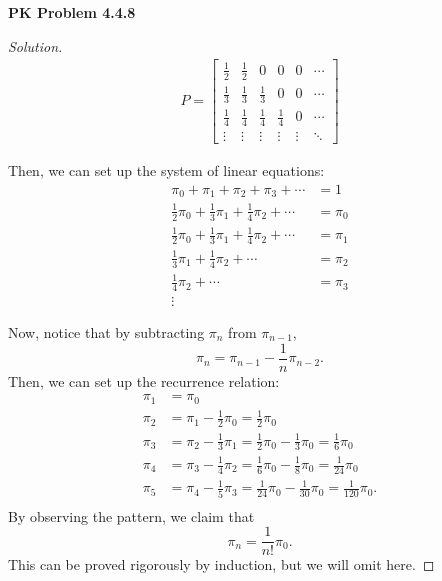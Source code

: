 \documentclass{article}
\begin{document}
\textbf{PK Problem 4.4.8}
\begin{proof}[Solution]
    \begin{align*}
        P = \begin{bmatrix}
            \frac{1}{2} & \frac{1}{2} & 0 & 0 & 0 & \cdots \\
            \frac{1}{3} & \frac{1}{3} & \frac{1}{3} & 0 & 0 & \cdots \\
            \frac{1}{4} & \frac{1}{4} & \frac{1}{4} & \frac{1}{4} & 0 & \cdots \\
            \vdots & \vdots & \vdots & \vdots & \vdots & \ddots
        \end{bmatrix}
    \end{align*}

    Then, we can set up the system of linear equations:
    \begin{align*}
        \pi_0 + \pi_1 + \pi_2 + \pi_3 + \cdots & = 1 \\
        \frac{1}{2}\pi_0 + \frac{1}{3}\pi_1 + \frac{1}{4}\pi_2 + \cdots & = \pi_0 \\
        \frac{1}{2}\pi_0 + \frac{1}{3}\pi_1 + \frac{1}{4}\pi_2 + \cdots & = \pi_1 \\
        \frac{1}{3}\pi_1 + \frac{1}{4}\pi_2 + \cdots & = \pi_2 \\
        \frac{1}{4}\pi_2 + \cdots & = \pi_3 \\
        \vdots &
    \end{align*}

    Now, notice that by subtracting $\pi_{n}$ from $\pi_{n-1}$, $$\pi_n = \pi_{n-1} - \frac{1}{n}\pi_{n-2}.$$
    Then, we can set up the recurrence relation:
    \begin{align*}
        \pi_1 & = \pi_0 \\
        \pi_2 & = \pi_1 - \frac{1}{2}\pi_0 = \frac{1}{2}\pi_0 \\
        \pi_3 & = \pi_2 - \frac{1}{3}\pi_1 = \frac{1}{2}\pi_0 - \frac{1}{3}\pi_0 = \frac{1}{6}\pi_0 \\
        \pi_4 & = \pi_3 - \frac{1}{4}\pi_2 = \frac{1}{6}\pi_0 - \frac{1}{8}\pi_0 = \frac{1}{24}\pi_0 \\
        \pi_5 & = \pi_4 - \frac{1}{5}\pi_3 = \frac{1}{24}\pi_0 - \frac{1}{30}\pi_0 = \frac{1}{120}\pi_0. \\
    \end{align*}
    By observing the pattern, we claim that $$\pi_n = \frac{1}{n!}\pi_0.$$ This can be proved rigorously by induction, but we will omit here.


\end{proof}
\end{document}
